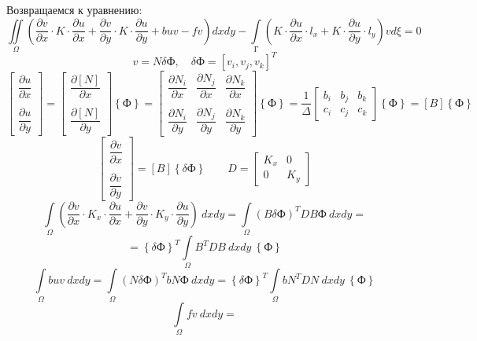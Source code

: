 \documentclass{bmstu}
\begin{document}
	Возвращаемся к уравнению:
	\[
	\iint\limits_{\Omega} (\frac{\partial v}{\partial x} \cdot K \cdot  \frac{\partial u}{\partial x} + \frac{\partial v}{\partial y} \cdot K \cdot  \frac{\partial u}{\partial y} + buv-fv)dxdy-\int\limits_{\text{Г}} (K \cdot  \frac{\partial u}{\partial x} \cdot l_x + K \cdot  \frac{\partial u}{\partial y} \cdot l_y)vd\xi = 0
	\]
	\[
	v=N\delta\text{Ф}, \quad \delta\text{Ф}=\left[v_i, v_j, v_k\right]^T
	\]
	\[
	\begin{bmatrix}
		\dfrac{\partial u}{\partial x} \\ \\ \dfrac{\partial u}{\partial y} 
	\end{bmatrix} = \begin{bmatrix}
	\dfrac{\partial \left[N\right]}{\partial x} \\  \\ \dfrac{\partial \left[N\right] }{\partial y} 
	\end{bmatrix} \left\{\text{Ф}\right\} = \begin{bmatrix}
	\dfrac{\partial N_i}{\partial x} & \dfrac{\partial N_j}{\partial x} & \dfrac{\partial N_k}{\partial x} \\ & & \\ \dfrac{\partial N_i}{\partial y} & \dfrac{\partial N_j}{\partial y} & \dfrac{\partial N_k}{\partial y}
	\end{bmatrix} \left\{\text{Ф}\right\} = \dfrac{1}{\Delta} \begin{bmatrix}
	b_i & b_ j & b_k \\ c_i & c_j & c_k
	\end{bmatrix} \left\{\text{Ф}\right\} = \left[B\right] \left\{\text{Ф}\right\}
	\]
	\[
	\begin{bmatrix}
		\dfrac{\partial v}{\partial x} \\ \\	\dfrac{\partial v}{\partial y}
	\end{bmatrix} = \left[B\right] \left\{\delta\text{Ф}\right\} \qquad D=\begin{bmatrix}
	K_x & 0 \\ 0 & K_y
	\end{bmatrix}
	\]
	\[
	\int\limits_{\Omega} \left(\frac{\partial v}{\partial x} \cdot K_x \cdot  \frac{\partial u}{\partial x} + \frac{\partial v}{\partial y} \cdot K_y \cdot  \frac{\partial u}{\partial y}\right)\ dxdy = \int\limits_{\Omega} (B\delta\text{Ф})^TDB\text{Ф}\ dxdy=
	\] 
	\[
	=\left\{ \delta \text{Ф} \right\}^T \int\limits_{\Omega} B^T D B \ dxdy \ \left\{ \text{Ф} \right\}
	\]
	\[
	\int\limits_{\Omega}  buv \ dxdy = \int\limits_{\Omega}  (N\delta \text{Ф}) ^ T bN \text{Ф} \ dxdy = \left\{ \delta \text{Ф} \right\}^T \int\limits_{\Omega} bN^T D N \ dxdy \ \left\{ \text{Ф} \right\}
	\]
	\[
	\int\limits_{\Omega}fv\ dxdy = 
	\]
	
\end{document}
